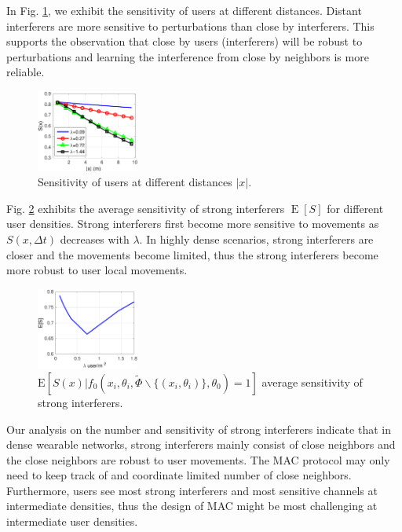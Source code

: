 \documentclass[10pt, conference, letterpaper]{IEEEtran}
\DeclareMathOperator*{\E}{\mathrm{E}}
\begin{document}
In Fig. \ref{fig:Channel_sensitivity}, we exhibit the sensitivity of users at different distances. Distant interferers are more sensitive to perturbations than close by interferers. 
This supports the observation that close by users (interferers) will be robust to perturbations and learning the interference from close by neighbors is more reliable. 

\begin{figure}
	\centering
	\includegraphics[width = 0.3\textwidth]{Channel_sensitivity.pdf}
	\caption{Sensitivity of users at different distances $|x|$.}
	\label{fig:Channel_sensitivity}
\end{figure}

Fig. \ref{fig:Channel_sensitivity_average} exhibits the average sensitivity of strong interferers $\E[S]$ for different user densities. 
Strong interferers first become more sensitive to movements as $S(x, \Delta t)$ decreases with $\lambda$. 
In highly dense scenarios, strong interferers are closer and the movements become limited, thus the strong interferers become more robust to user local movements.

\begin{figure}
	\centering
	\includegraphics[width = 0.3\textwidth]{Channel_sensitivity_average.pdf}
	\caption{$\mathrm{E}[S(x)|f_0(x_i, \theta_i, \tilde{\Phi}\backslash\{(x_i,\theta_i)\}, \theta_0)=1]$ average sensitivity of strong interferers.}
	\label{fig:Channel_sensitivity_average}
\end{figure}

Our analysis on the number and sensitivity of strong interferers indicate that in dense wearable networks, strong interferers mainly consist of close neighbors and the close neighbors are robust to user movements. The MAC protocol may only need to keep track of and coordinate limited number of close neighbors. Furthermore, users see most strong interferers and most sensitive channels at intermediate densities, thus the design of MAC might be most challenging at intermediate user densities.
\end{document}
